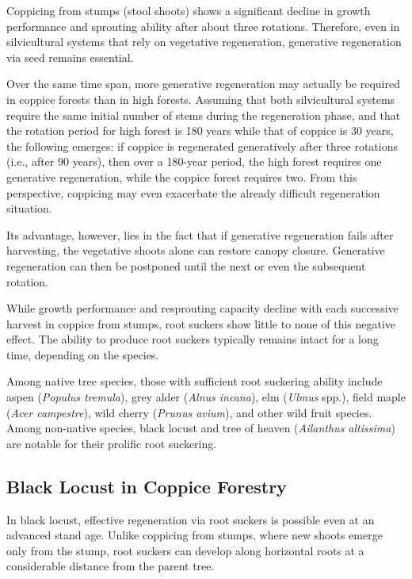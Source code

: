 Coppicing from stumps (stool shoots) shows a significant decline in growth performance and sprouting ability after about three rotations. Therefore, even in silvicultural systems that rely on vegetative regeneration, generative regeneration via seed remains essential.

Over the same time span, more generative regeneration may actually be required in coppice forests than in high forests. Assuming that both silvicultural systems require the same initial number of stems during the regeneration phase, and that the rotation period for high forest is 180 years while that of coppice is 30 years, the following emerges: if coppice is regenerated generatively after three rotations (i.e., after 90 years), then over a 180-year period, the high forest requires one generative regeneration, while the coppice forest requires two. From this perspective, coppicing may even exacerbate the already difficult regeneration situation.

Its advantage, however, lies in the fact that if generative regeneration fails after harvesting, the vegetative shoots alone can restore canopy closure. Generative regeneration can then be postponed until the next or even the subsequent rotation.

While growth performance and resprouting capacity decline with each successive harvest in coppice from stumps, root suckers show little to none of this negative effect. The ability to produce root suckers typically remains intact for a long time, depending on the species.

Among native tree species, those with sufficient root suckering ability include aspen (\emph{Populus tremula}), grey alder (\emph{Alnus incana}), elm (\emph{Ulmus} spp.), field maple (\emph{Acer campestre}), wild cherry (\emph{Prunus avium}), and other wild fruit species. Among non-native species, black locust and tree of heaven (\emph{Ailanthus altissima}) are notable for their prolific root suckering.

\subsection{Black Locust in Coppice Forestry}

In black locust, effective regeneration via root suckers is possible even at an advanced stand age. Unlike coppicing from stumps, where new shoots emerge only from the stump, root suckers can develop along horizontal roots at a considerable distance from the parent tree.

